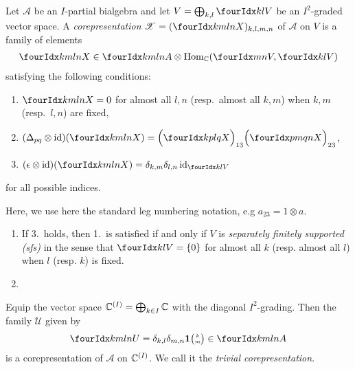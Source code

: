 \begin{Def} \label{definition:corep} Let $\mathscr{A}$ be an $I$-partial bialgebra and let
  $V=\bigoplus_{k,l} \Gru{V}{k}{l}$ be an $I^{2}$-graded vector space.  A \emph{corepresentation}
  $\mathscr{X}=(\Gr{X}{k}{l}{m}{n})_{k,l,m,n}$  of $\mathscr{A}$ on $V$ is a family
 of elements
 \begin{align} \label{eq:corep-blocks}
   \Gr{X}{k}{l}{m}{n} \in \Gr{A}{k}{l}{m}{n} \otimes
  \Hom_\C(\Gru{V}{m}{n},\Gru{V}{k}{l})
 \end{align}
 satisfying the following conditions:
  \begin{enumerate}
  \item $\Gr{X}{k}{l}{m}{n}=0$ for almost all $l,n$ (resp.\ almost all
    $k,m$) when $k,m$ (resp.\ $l,n$) are fixed,
  \item $ (\Delta_{pq} \otimes
    \id)(\Gr{X}{k}{l}{m}{n}) =
    \Big{(}\Gr{X}{k}{l}{p}{q}\Big{)}_{13}\Big{(}\Gr{X}{p}{q}{m}{n}\Big{)}_{23}$,
  \item $(\epsilon \otimes
  \id)(\Gr{X}{k}{l}{m}{n})=\delta_{k,m}\delta_{l,n}\id_{\Gru{V}{k}{l}}$
  \end{enumerate}
  for all possible indices.
\end{Def}
Here, we use here the standard leg numbering notation, e.g $a_{23}=1\otimes a$.
\begin{Rem}
  \begin{enumerate}
  \item If 3.\ holds, then 1.\ is satisfied if and only if $V$ is
    \emph{separately finitely supported (sfs)} in the sense that
    $\Gru{V}{k}{l} = \{0\}$ for almost all $k$ (resp. almost all $l$)
    when $l$ (resp. $k$) is fixed.
  \item 
  \end{enumerate}
\end{Rem}
\begin{Exa} \label{example:corep-triv} Equip the vector space
  $\mathbb{C}^{(I)}=\bigoplus_{k\in I} \mathbb{C}$ with the diagonal
  $I^{2}$-grading. Then the family $\mathscr{U}$ given by
  \begin{align} \label{eq:corep-triv}
    \Gr{U}{k}{l}{m}{n} = \delta_{k,l}\delta_{m,n} \UnitC{k}{m} \in
    \Gr{A}{k}{l}{m}{n}
  \end{align}
is a corepresentation of $\mathscr{A}$ on $\mathbb{C}^{(I)}$. We call it the
\emph{trivial corepresentation}.
\end{Exa}

